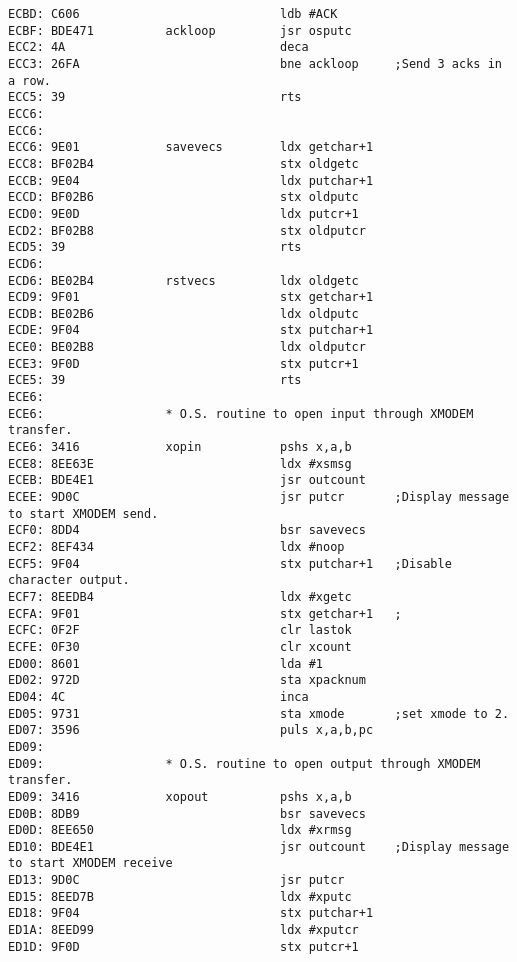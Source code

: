 {\begin{verbatim}
ECBD: C606                            ldb #ACK
ECBF: BDE471          ackloop         jsr osputc
ECC2: 4A                              deca
ECC3: 26FA                            bne ackloop     ;Send 3 acks in a row.
ECC5: 39                              rts
ECC6:                 
ECC6:                 
ECC6: 9E01            savevecs        ldx getchar+1
ECC8: BF02B4                          stx oldgetc
ECCB: 9E04                            ldx putchar+1
ECCD: BF02B6                          stx oldputc
ECD0: 9E0D                            ldx putcr+1
ECD2: BF02B8                          stx oldputcr
ECD5: 39                              rts
ECD6:                 
ECD6: BE02B4          rstvecs         ldx oldgetc
ECD9: 9F01                            stx getchar+1
ECDB: BE02B6                          ldx oldputc
ECDE: 9F04                            stx putchar+1
ECE0: BE02B8                          ldx oldputcr
ECE3: 9F0D                            stx putcr+1
ECE5: 39                              rts     
ECE6:                 
ECE6:                 * O.S. routine to open input through XMODEM transfer.
ECE6: 3416            xopin           pshs x,a,b
ECE8: 8EE63E                          ldx #xsmsg
ECEB: BDE4E1                          jsr outcount
ECEE: 9D0C                            jsr putcr       ;Display message to start XMODEM send.
ECF0: 8DD4                            bsr savevecs
ECF2: 8EF434                          ldx #noop
ECF5: 9F04                            stx putchar+1   ;Disable character output.
ECF7: 8EEDB4                          ldx #xgetc
ECFA: 9F01                            stx getchar+1   ;
ECFC: 0F2F                            clr lastok
ECFE: 0F30                            clr xcount
ED00: 8601                            lda #1
ED02: 972D                            sta xpacknum
ED04: 4C                              inca
ED05: 9731                            sta xmode       ;set xmode to 2.
ED07: 3596                            puls x,a,b,pc
ED09:                 
ED09:                 * O.S. routine to open output through XMODEM transfer.
ED09: 3416            xopout          pshs x,a,b
ED0B: 8DB9                            bsr savevecs
ED0D: 8EE650                          ldx #xrmsg
ED10: BDE4E1                          jsr outcount    ;Display message to start XMODEM receive
ED13: 9D0C                            jsr putcr
ED15: 8EED7B                          ldx #xputc
ED18: 9F04                            stx putchar+1
ED1A: 8EED99                          ldx #xputcr
ED1D: 9F0D                            stx putcr+1

\end{verbatim}}
